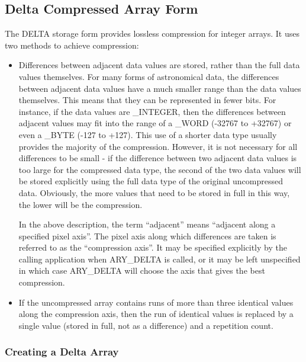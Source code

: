 \documentclass[twoside,11pt,nolof]{starlink}
\begin{document}
\subsection{\label{ss:deltaform}Delta Compressed Array Form}

The DELTA storage form provides lossless compression for integer arrays.
It uses two methods to achieve compression:

\begin{itemize}

\item Differences between adjacent data values are stored, rather than
the full data values themselves. For many forms of astronomical data, the
differences between adjacent data values have a much smaller range than
the data values themselves. This means that they can be represented in
fewer bits. For instance, if the data values are \_INTEGER, then the
differences between adjacent values may fit into the range of a \_WORD
(-32767 to +32767) or even a \_BYTE (-127 to +127). This use of a shorter
data type usually provides the majority of the compression. However, it is not
necessary for all differences to be small - if the difference between two
adjacent data values is too large for the compressed data type, the
second of the two data values will be stored explicitly using the full data
type of the original uncompressed data. Obviously, the more values that
need to be stored in full in this way, the lower will be the compression.

In the above description, the term ``adjacent'' means ``adjacent along a
specified pixel axis''. The pixel axis along which differences are taken
is referred to as the ``compression axis''. It may be specified
explicitly by the calling application when ARY\_DELTA is called, or it
may be left unspecified in which case ARY\_DELTA will choose the axis that
gives the best compression.

\item If the uncompressed array contains runs of more than three identical
values along the compression axis, then the run of identical values is
replaced by a single value (stored in full, not as a difference) and a
repetition count.

\end{itemize}

\subsubsection{Creating a Delta Array}
\end{document}
